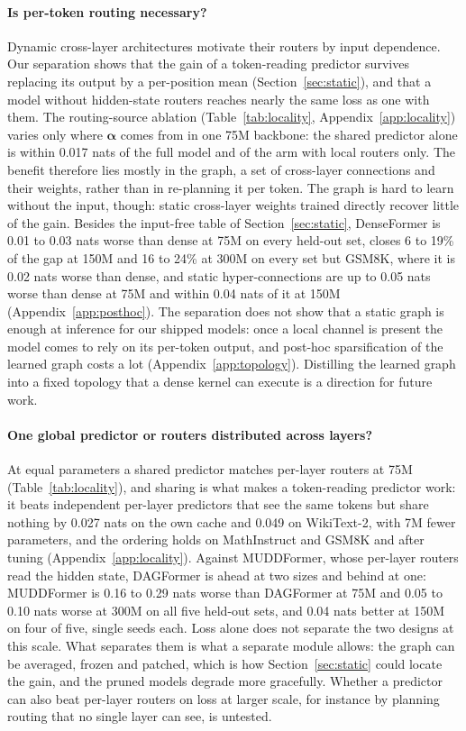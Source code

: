 \documentclass[11pt]{article}
\newcommand{\dagf}{DAGFormer}
\newcommand{\valpha}{\boldsymbol{\alpha}}
\begin{document}
\paragraph{Is per-token routing necessary?} Dynamic cross-layer architectures motivate their routers by input dependence. Our separation shows that the gain of a token-reading predictor survives replacing its output by a per-position mean (Section~\ref{sec:static}), and that a model without hidden-state routers reaches nearly the same loss as one with them. The routing-source ablation (Table~\ref{tab:locality}, Appendix~\ref{app:locality}) varies only where $\valpha$ comes from in one 75M backbone: the shared predictor alone is within 0.017 nats of the full model and of the arm with local routers only. The benefit therefore lies mostly in the graph, a set of cross-layer connections and their weights, rather than in re-planning it per token. The graph is hard to learn without the input, though: static cross-layer weights trained directly recover little of the gain. Besides the input-free table of Section~\ref{sec:static}, DenseFormer is 0.01 to 0.03 nats worse than dense at 75M on every held-out set, closes 6 to 19\% of the gap at 150M and 16 to 24\% at 300M on every set but GSM8K, where it is 0.02 nats worse than dense, and static hyper-connections are up to 0.05 nats worse than dense at 75M and within 0.04 nats of it at 150M (Appendix~\ref{app:posthoc}). The separation does not show that a static graph is enough at inference for our shipped models: once a local channel is present the model comes to rely on its per-token output, and post-hoc sparsification of the learned graph costs a lot (Appendix~\ref{app:topology}). Distilling the learned graph into a fixed topology that a dense kernel can execute is a direction for future work.

\paragraph{One global predictor or routers distributed across layers?} At equal parameters a shared predictor matches per-layer routers at 75M (Table~\ref{tab:locality}), and sharing is what makes a token-reading predictor work: it beats independent per-layer predictors that see the same tokens but share nothing by 0.027 nats on the own cache and 0.049 on WikiText-2, with 7M fewer parameters, and the ordering holds on MathInstruct and GSM8K and after tuning (Appendix~\ref{app:locality}). Against MUDDFormer, whose per-layer routers read the hidden state, \dagf{} is ahead at two sizes and behind at one: MUDDFormer is 0.16 to 0.29 nats worse than \dagf{} at 75M and 0.05 to 0.10 nats worse at 300M on all five held-out sets, and 0.04 nats better at 150M on four of five, single seeds each. Loss alone does not separate the two designs at this scale. What separates them is what a separate module allows: the graph can be averaged, frozen and patched, which is how Section~\ref{sec:static} could locate the gain, and the pruned models degrade more gracefully. Whether a predictor can also beat per-layer routers on loss at larger scale, for instance by planning routing that no single layer can see, is untested.
\end{document}

